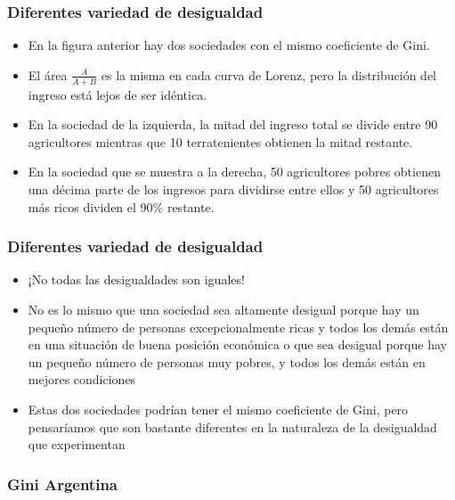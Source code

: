 \documentclass{beamer}
\begin{document}
\begin{frame} 
\frametitle{Diferentes variedad de desigualdad}
\begin{itemize}
\item En la figura anterior hay dos sociedades con el mismo coeficiente de Gini.
\item El área $\frac{A}{A + B}$ es la misma en cada curva de Lorenz, pero la distribución del ingreso está lejos de ser idéntica.
\item En la sociedad de la izquierda, la mitad del ingreso total se divide entre 90 agricultores mientras que 10 terratenientes obtienen la mitad restante. 
\item En la sociedad que se muestra a la derecha, 50 agricultores pobres obtienen una décima parte de los ingresos para dividirse entre ellos y 50 agricultores más ricos dividen el 90\% restante.
\end{itemize}
\end{frame}

\begin{frame} 
\frametitle{Diferentes variedad de desigualdad}
\begin{itemize}
\item ¡No todas las desigualdades son iguales!
\item No es lo mismo que una sociedad sea altamente desigual porque hay un pequeño número de personas excepcionalmente ricas y todos los demás están en una situación de buena posición económica o que sea desigual porque hay un pequeño número de personas muy pobres, y todos los demás están en mejores condiciones
\item Estas dos sociedades podrían tener el mismo coeficiente de Gini, pero pensaríamos que son bastante diferentes en la naturaleza de la desigualdad que experimentan
\end{itemize}
\end{frame}

\begin{frame} 
\frametitle{Gini Argentina}

\end{frame}
\end{document}
